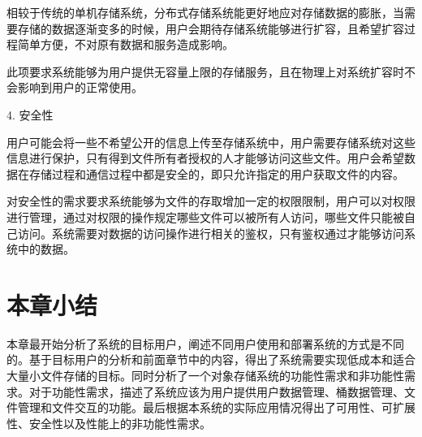 相较于传统的单机存储系统，分布式存储系统能更好地应对存储数据的膨胀，当需要存储的数据逐渐变多的时候，用户会期待存储系统能够进行扩容，且希望扩容过程简单方便，不对原有数据和服务造成影响。

此项要求系统能够为用户提供无容量上限的存储服务，且在物理上对系统扩容时不会影响到用户的正常使用。

4. 安全性

用户可能会将一些不希望公开的信息上传至存储系统中，用户需要存储系统对这些信息进行保护，只有得到文件所有者授权的人才能够访问这些文件。用户会希望数据在存储过程和通信过程中都是安全的，即只允许指定的用户获取文件的内容。

对安全性的需求要求系统能够为文件的存取增加一定的权限限制，用户可以对权限进行管理，通过对权限的操作规定哪些文件可以被所有人访问，哪些文件只能被自己访问。系统需要对数据的访问操作进行相关的鉴权，只有鉴权通过才能够访问系统中的数据。

\section{本章小结}%
本章最开始分析了系统的目标用户，阐述不同用户使用和部署系统的方式是不同的。基于目标用户的分析和前面章节中的内容，得出了系统需要实现低成本和适合大量小文件存储的目标。同时分析了一个对象存储系统的功能性需求和非功能性需求。对于功能性需求，描述了系统应该为用户提供用户数据管理、桶数据管理、文件管理和文件交互的功能。最后根据本系统的实际应用情况得出了可用性、可扩展性、安全性以及性能上的非功能性需求。 
